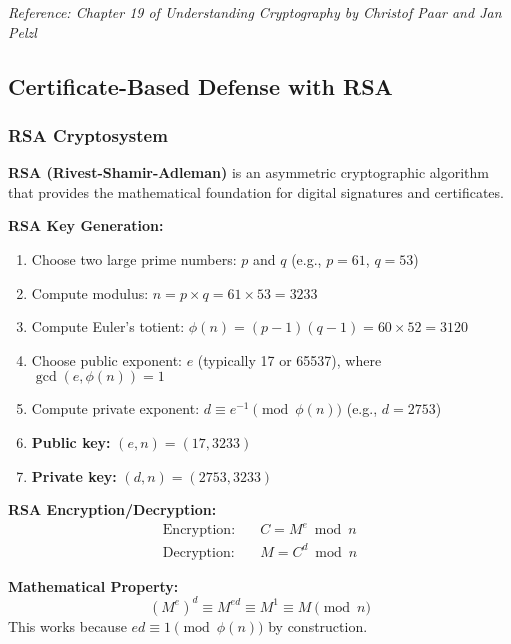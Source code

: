 \documentclass[a4paper,12pt]{extarticle}
\begin{document}
\textit{Reference: Chapter 19 of Understanding Cryptography by Christof Paar and Jan Pelzl}

\vspace{0.5cm}

\subsection{Certificate-Based Defense with RSA}

\subsubsection*{RSA Cryptosystem}

\textbf{RSA (Rivest-Shamir-Adleman)} is an asymmetric cryptographic algorithm that provides the mathematical foundation for digital signatures and certificates.

\begin{tcolorbox}[
    enhanced,
    colback=blue!5,
    colframe=blue!70!black,
    boxrule=1.5pt,
    arc=3mm,
    left=10pt, right=10pt, top=10pt, bottom=10pt
]
\textbf{RSA Key Generation:}
\begin{enumerate}
    \item Choose two large prime numbers: $p$ and $q$ (e.g., $p=61$, $q=53$)
    \item Compute modulus: $n = p \times q = 61 \times 53 = 3233$
    \item Compute Euler's totient: $\phi(n) = (p-1)(q-1) = 60 \times 52 = 3120$
    \item Choose public exponent: $e$ (typically 17 or 65537), where $\gcd(e, \phi(n)) = 1$
    \item Compute private exponent: $d \equiv e^{-1} \pmod{\phi(n)}$ (e.g., $d = 2753$)
    \item \textbf{Public key:} $(e, n) = (17, 3233)$
    \item \textbf{Private key:} $(d, n) = (2753, 3233)$
\end{enumerate}

\textbf{RSA Encryption/Decryption:}
\begin{align*}
\text{Encryption:} \quad & C = M^e \bmod n \\
\text{Decryption:} \quad & M = C^d \bmod n
\end{align*}

\textbf{Mathematical Property:}
\begin{equation*}
(M^e)^d \equiv M^{ed} \equiv M^{1} \equiv M \pmod{n}
\end{equation*}
This works because $ed \equiv 1 \pmod{\phi(n)}$ by construction.
\end{tcolorbox}
\end{document}
